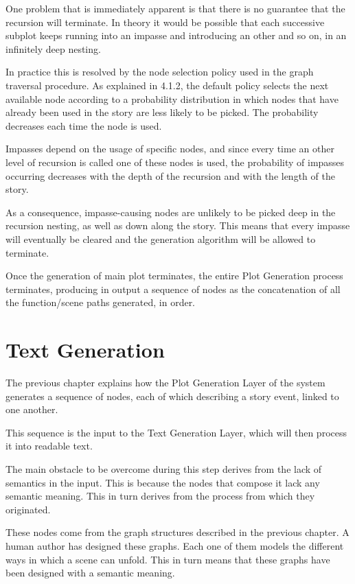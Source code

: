 \documentclass[12pt,a4paper,oneside]{report}
\begin{document}
\bigskip

One problem that is immediately apparent is that there is no guarantee that the recursion will terminate. In theory it would be possible that each successive subplot keeps running into an impasse and introducing an other and so on, in an infinitely deep nesting.

\bigskip

In practice this is resolved by the node selection policy used in the graph traversal procedure. As explained in 4.1.2, the default policy selects the next available node according to a probability distribution in which nodes that have already been used in the story are less likely to be picked. The probability decreases each time the node is used.

Impasses depend on the usage of specific nodes, and since every time an other level of recursion is called one of these nodes is used, the probability of impasses occurring decreases with the depth of the recursion and with the length of the story. 

As a consequence, impasse-causing nodes are unlikely to be picked deep in the recursion nesting, as well as down along the story. This means that every impasse will eventually be cleared and the generation algorithm will be allowed to terminate.

\bigskip

Once the generation of main plot terminates, the entire Plot Generation process terminates, producing in output a sequence of nodes as the concatenation of all the function/scene paths generated, in order.

\pagebreak

\chapter{Text Generation}
The previous chapter explains how the Plot Generation Layer of the system generates a sequence of nodes, each of which describing a story event, linked to one another.

This sequence is the input to the Text Generation Layer, which will then process it into readable text.

\bigskip

The main obstacle to be overcome during this step derives from the lack of semantics in the input. This is because the nodes that compose it lack any semantic meaning. This in turn derives from the process from which they originated.

These nodes come from the graph structures described in the previous chapter. A human author has designed these graphs. Each one of them models the different ways in which a scene can unfold. This in turn means that these graphs have been designed with a semantic meaning. 
\end{document}
